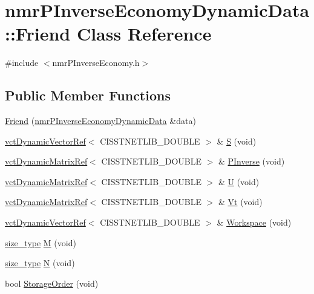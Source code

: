\hypertarget{classnmr_p_inverse_economy_dynamic_data_1_1_friend}{}\section{nmr\+P\+Inverse\+Economy\+Dynamic\+Data\+:\+:Friend Class Reference}
\label{classnmr_p_inverse_economy_dynamic_data_1_1_friend}


{\ttfamily \#include $<$nmr\+P\+Inverse\+Economy.\+h$>$}

\subsection*{Public Member Functions}
\begin{DoxyCompactItemize}
\item 
\hyperlink{classnmr_p_inverse_economy_dynamic_data_1_1_friend_a71b324bc90fb8a5ec690e635e811d51a}{Friend} (\hyperlink{classnmr_p_inverse_economy_dynamic_data}{nmr\+P\+Inverse\+Economy\+Dynamic\+Data} \&data)
\item 
\hyperlink{classvct_dynamic_vector_ref}{vct\+Dynamic\+Vector\+Ref}$<$ C\+I\+S\+S\+T\+N\+E\+T\+L\+I\+B\+\_\+\+D\+O\+U\+B\+L\+E $>$ \& \hyperlink{classnmr_p_inverse_economy_dynamic_data_1_1_friend_a537ca993dbfd73507c1776ebdb3f7054}{S} (void)
\item 
\hyperlink{classvct_dynamic_matrix_ref}{vct\+Dynamic\+Matrix\+Ref}$<$ C\+I\+S\+S\+T\+N\+E\+T\+L\+I\+B\+\_\+\+D\+O\+U\+B\+L\+E $>$ \& \hyperlink{classnmr_p_inverse_economy_dynamic_data_1_1_friend_aa52a780bd3b890fcf5ca7c71569d07aa}{P\+Inverse} (void)
\item 
\hyperlink{classvct_dynamic_matrix_ref}{vct\+Dynamic\+Matrix\+Ref}$<$ C\+I\+S\+S\+T\+N\+E\+T\+L\+I\+B\+\_\+\+D\+O\+U\+B\+L\+E $>$ \& \hyperlink{classnmr_p_inverse_economy_dynamic_data_1_1_friend_aa8af25256ee8c38f2056b03aaefebb31}{U} (void)
\item 
\hyperlink{classvct_dynamic_matrix_ref}{vct\+Dynamic\+Matrix\+Ref}$<$ C\+I\+S\+S\+T\+N\+E\+T\+L\+I\+B\+\_\+\+D\+O\+U\+B\+L\+E $>$ \& \hyperlink{classnmr_p_inverse_economy_dynamic_data_1_1_friend_a5300b5ad810345ed11cefa0d4a7bf9d3}{Vt} (void)
\item 
\hyperlink{classvct_dynamic_vector_ref}{vct\+Dynamic\+Vector\+Ref}$<$ C\+I\+S\+S\+T\+N\+E\+T\+L\+I\+B\+\_\+\+D\+O\+U\+B\+L\+E $>$ \& \hyperlink{classnmr_p_inverse_economy_dynamic_data_1_1_friend_aee3ade137607514363c2597cf817043b}{Workspace} (void)
\item 
\hyperlink{classnmr_p_inverse_economy_dynamic_data_a32ab8d601abf927292b49d0cea124f9b}{size\+\_\+type} \hyperlink{classnmr_p_inverse_economy_dynamic_data_1_1_friend_a07903bb5ac1e44f2ed592c44227eee5b}{M} (void)
\item 
\hyperlink{classnmr_p_inverse_economy_dynamic_data_a32ab8d601abf927292b49d0cea124f9b}{size\+\_\+type} \hyperlink{classnmr_p_inverse_economy_dynamic_data_1_1_friend_aea8b62a7c398782300bcacf8040d958e}{N} (void)
\item 
bool \hyperlink{classnmr_p_inverse_economy_dynamic_data_1_1_friend_a87b140bd21f1f980a501b84524cd69c9}{Storage\+Order} (void)
\end{DoxyCompactItemize}


